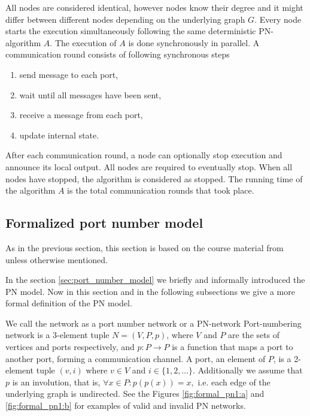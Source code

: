 All nodes are considered identical, however nodes know their degree and it might differ between different nodes depending on the underlying graph $G$.
Every node starts the execution simultaneously following the same deterministic PN-algorithm $A$.
The execution of $A$ is done synchronously in parallel.
A communication round consists of following synchronous steps
\begin{enumerate}
  \item send message to each port,
  \item wait until all messages have been sent,
  \item receive a message from each port,
  \item update internal state.
\end{enumerate}
After each communication round, a node can optionally stop execution and announce its local output.
All nodes are required to eventually stop.
When all nodes have stopped, the algorithm is considered as stopped.
The running time of the algorithm $A$ is the total communication rounds that took place.


\subsection{Formalized port number model}
As in the previous section, this section is based on the course material from \cite{HirvonenSuomelaDistAlg2020} unless otherwise mentioned.

In the section \ref{sec:port_number_model} we briefly and informally introduced the PN model.
Now in this section and in the following subsections we give a more formal definition of the PN model.

We call the network as a port number network or a PN-network
Port-numbering network is a 3-element tuple $N = (V, P, p)$, where $V$ and $P$ are the sets of vertices and ports respectively, and $p: P \rightarrow P$ is a function that maps a port to another port, forming a communication channel.
A port, an element of $P$, is a 2-element tuple $(v, i)$ where $v \in V$ and $i \in \{1, 2, ...\}$.
Additionally we assume that $p$ is an involution, that is, $\forall x \in P : p(p(x)) = x, $ i.e. each edge of the underlying graph is undirected.
See the Figures \ref{fig:formal_pn1:a} and \ref{fig:formal_pn1:b} for examples of valid and invalid PN networks.

